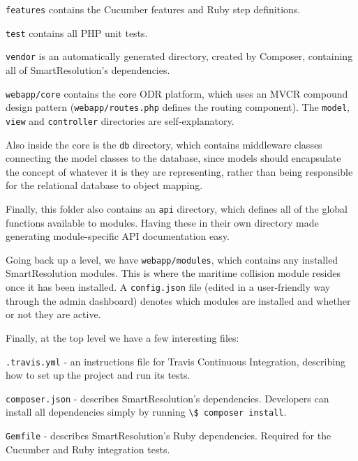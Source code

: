 \lstinline{features} contains the Cucumber features and Ruby step definitions.

\lstinline{test} contains all PHP unit tests.

\lstinline{vendor} is an automatically generated directory, created by Composer, containing all of SmartResolution's dependencies.

\lstinline{webapp/core} contains the core ODR platform, which uses an MVCR compound design pattern (\lstinline{webapp/routes.php} defines the routing component). The \lstinline{model}, \lstinline{view} and \lstinline{controller} directories are self-explanatory.

Also inside the core is the \lstinline{db} directory, which contains middleware classes connecting the model classes to the database, since models should encapsulate the concept of whatever it is they are representing, rather than being responsible for the relational database to object mapping.

Finally, this folder also contains an \lstinline{api} directory, which defines all of the global functions available to modules. Having these in their own directory made generating module-specific API documentation easy.

Going back up a level, we have \lstinline{webapp/modules}, which contains any installed SmartResolution modules. This is where the maritime collision module resides once it has been installed. A \lstinline{config.json} file (edited in a user-friendly way through the admin dashboard) denotes which modules are installed and whether or not they are active.

Finally, at the top level we have a few interesting files:

\lstinline{.travis.yml} - an instructions file for Travis Continuous Integration, describing how to set up the project and run its tests.

\lstinline{composer.json} - describes SmartResolution's dependencies. Developers can install all dependencies simply by running \lstinline{\$ composer install}.

\lstinline{Gemfile} - describes SmartResolution's Ruby dependencies. Required for the Cucumber and Ruby integration tests.